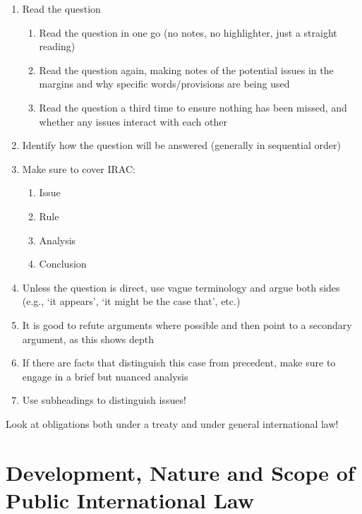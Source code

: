\begin{tcolorbox}[title = How to Answer a Problem Question]
    \flushleft
    \begin{enumerate}
        \item Read the question
        \begin{enumerate}
            \item Read the question in one go (no notes, no highlighter, just a straight reading)
            \item Read the question again, making notes of the potential issues in the margins and why specific words/provisions are being used
            \item Read the question a third time to ensure nothing has been missed, and whether any issues interact with each other
        \end{enumerate}
        \item Identify how the question will be answered (generally in sequential order)
        \item Make sure to cover IRAC:
        \begin{enumerate}
            \item Issue
            \item Rule
            \item Analysis
            \item Conclusion
        \end{enumerate}
        \item Unless the question is direct, use vague terminology and argue both sides (e.g., `it appears', `it might be the case that', etc.)
        \item It is good to refute arguments where possible and then point to a secondary argument, as this shows depth
        \item If there are facts that distinguish this case from precedent, make sure to engage in a brief but nuanced analysis
        \item Use subheadings to distinguish issues!
    \end{enumerate}
    Look at obligations both under a treaty and under general international law!
\end{tcolorbox}

\section{Development, Nature and Scope of Public International Law}

